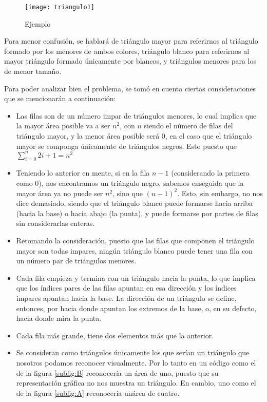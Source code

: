\documentclass[letterpaper]{article}
\begin{document}
    \begin{figure}[h!]
      \centering
      \texttt{[image: triangulo1]}
      \caption{Ejemplo}
    \end{figure}

  Para menor confusi\'on, se hablar\'a de tri\'angulo mayor para
  referirnos al tri\'angulo formado por los menores de ambos colores, tri\'angulo
  blanco para referirnos al mayor tri\'angulo formado \'unicamente por blancos, y
  tri\'angulos menores para los de menor tama\~no.\par

  Para poder analizar bien el problema, se tom\'o en cuenta ciertas
  consideraciones que se mencionar\'an a continuaci\'on:
    \begin{itemize}
    \item Las filas son de un n\'umero impar de tri\'angulos menores,
    lo cual implica que la mayor \'area posible va a ser \(n^2\), con \(n\) siendo el
    n\'umero de filas del tri\'angulo mayor, y la menor \'area posible ser\'a 0,
    en el caso que el tri\'angulo mayor se componga \'unicamente de tri\'angulos
    negros. Esto puesto que $\sum_{i=0}^{n} 2{i}+1 = {n}^2$
    \item Teniendo lo anterior en mente, si en la fila \(n-1\) (considerando la
    primera como 0), nos encontramos un tri\'angulo negro, sabemos enseguida
    que la mayor \'area ya no puede ser \({n}^2\), sino que \({(n-1)}^2\). Esto, sin embargo,
    no nos dice demasiado, siendo que el tri\'angulo blanco puede formarse hacia
    arriba (hacia la base) o hacia abajo (la punta), y puede formarse por
    partes de filas sin considerarlas enteras.
    \item Retomando la consideraci\'on, puesto que las filas que componen el
    tri\'angulo mayor son todas impares, ning\'un tri\'angulo blanco puede tener
    una fila con un n\'umero par de tri\'angulos menores.
    \item Cada fila empieza y termina con un tri\'angulo hacia la punta, lo que
    implica que los \'indices pares de las filas apuntan en esa direcci\'on y
    los \'indices impares apuntan hacia la base. La direcci\'on de un tri\'angulo
    se define, entonces, por hacia donde apuntan los extremos de la base, o,
    en su defecto, hacia donde mira la punta.
    \item Cada fila m\'as grande, tiene dos elementos m\'as que la
    anterior.
    \item Se consideran como tri\'angulos \'unicamente los que ser\'ian un
    tri\'angulo que nosotros podamos reconocer visualmente. Por
    lo tanto en un c\'odigo como el de la figura \ref{subfig:B} reconocer\'ia un
    \'area de uno, puesto que su representaci\'on gr\'afica no nos
    muestra un tri\'angulo. En cambio, uno como el de la figura \ref{subfig:A} reconocer\'ia un\'area de cuatro.
    \end{itemize}
\end{document}
